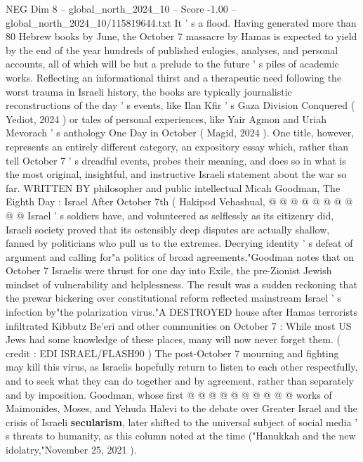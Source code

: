\begin{textsample}{NEG Dim 8 – global\_north\_2024\_10 – Score -1.00 – global\_north\_2024\_10/115819644.txt}  \label{ex:f8_neg_297}
It ' s a flood.
Having generated more than 80 Hebrew books by June, the October 7 massacre by Hamas is expected to yield by the end of the year hundreds of published eulogies, analyses, and personal accounts, all of which will be but a prelude to the future ' s piles of academic works.
Reflecting an informational thirst and a therapeutic need following the worst trauma in Israeli history, the books are typically journalistic reconstructions of the day ' s events, like Ilan Kfir ' s Gaza Division Conquered ( Yediot, 2024 ) or tales of personal experiences, like Yair Agmon and Uriah Mevorach ' s anthology One Day in October ( Magid, 2024 ).
One title, however, represents an entirely different category, an expository essay which, rather than tell October 7 ' s dreadful events, probes their meaning, and does so in what is the most original, insightful, and instructive Israeli statement about the war so far.
WRITTEN BY philosopher and public intellectual Micah Goodman, The Eighth Day : Israel After October 7th ( Hakipod Vehashual, @ @ @ @ @ @ @ @ @ @ Israel ' s soldiers have, and volunteered as selflessly as its citizenry did, Israeli society proved that its ostensibly deep disputes are actually shallow, fanned by politicians who pull us to the extremes.
Decrying identity ' s defeat of argument and calling for"a politics of broad agreements,"Goodman notes that on October 7 Israelis were thrust for one day into Exile, the pre-Zionist Jewish mindset of vulnerability and helplessness.
The result was a sudden reckoning that the prewar bickering over constitutional reform reflected mainstream Israel ' s infection by"the polarization virus."A DESTROYED house after Hamas terrorists infiltrated Kibbutz Be'eri and other communities on October 7 : While most US Jews had some knowledge of these places, many will now never forget them. ( credit : EDI ISRAEL/FLASH90 ) The post-October 7 mourning and fighting may kill this virus, as Israelis hopefully return to listen to each other respectfully, and to seek what they can do together and by agreement, rather than separately and by imposition.
Goodman, whose first @ @ @ @ @ @ @ @ @ @ works of Maimonides, Moses, and Yehuda Halevi to the debate over Greater Israel and the crisis of Israeli \textbf{secularism}, later shifted to the universal subject of social media ' s threats to humanity, as this column noted at the time ("Hanukkah and the new idolatry,"November 25, 2021 ).

\end{textsample}
